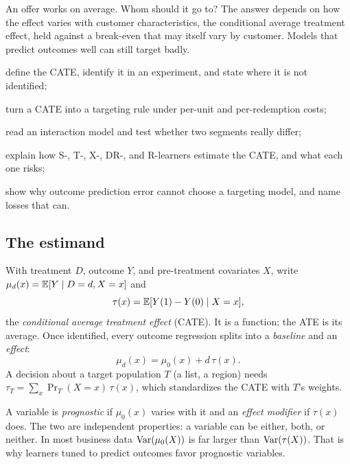 \documentclass[11pt]{article}
\begin{document}

\begin{decision}
An offer works on average. Whom should it go to? The answer depends on how the effect varies with customer
characteristics, the conditional average treatment effect, held against a break-even that may itself vary
by customer. Models that predict outcomes well can still target badly.
\end{decision}

\begin{goals}
  \item define the CATE, identify it in an experiment, and state where it is not identified;
  \item turn a CATE into a targeting rule under per-unit and per-redemption costs;
  \item read an interaction model and test whether two segments really differ;
  \item explain how S-, T-, X-, DR-, and R-learners estimate the CATE, and what each one risks;
  \item show why outcome prediction error cannot choose a targeting model, and name losses that can.
\end{goals}

\sectionone

\subsection{The estimand}

With treatment $D$, outcome $Y$, and pre-treatment covariates $X$, write $\mu_d(x) = \mathbb{E}[Y \mid D=d, X=x]$ and
\[
  \tau(x) = \mathbb{E}[Y(1) - Y(0) \mid X = x],
\]
the \emph{conditional average treatment effect} (CATE). It is a function; the ATE is its average. Once
identified, every outcome regression splits into a \emph{baseline} and an \emph{effect}:
\begin{equation}\label{eq:decomp}
  \mu_d(x) = \mu_0(x) + d\,\tau(x).
\end{equation}
A decision about a target population $T$ (a list, a region) needs $\tau_T = \sum_x \Pr_T(X=x)\,\tau(x)$, which
standardizes the CATE with $T$'s weights.

A variable is \emph{prognostic} if $\mu_0(x)$ varies with it and an \emph{effect modifier} if $\tau(x)$ does.
The two are independent properties: a variable can be either, both, or neither. In most business data
$\operatorname{Var}(\mu_0(X))$ is far larger than $\operatorname{Var}(\tau(X))$. That is why learners tuned to predict outcomes favor
prognostic variables.
\end{document}
